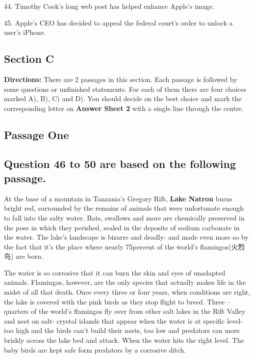 \documentclass[UTF8,11pt]{ctexart}
\begin{document}
44. Timothy Cook’s long web post has helped enhance Apple’s image.


45. Apple’s CEO has decided to appeal the federal court’s order to unlock a user’s iPhone.


\subsection*{\textbf{Section C}}


\textbf{Directions:} There are 2 passages in this section. Each passage is followed by some questions or unfinished statements. For each of them there are four choices marked A), B), C) and D). You should decide on the best choice and mark the corresponding letter on\textbf{ Answer Sheet 2} with a single line through the centre.


\subsection*{\textbf{Passage One}}


\subsection*{\textbf{Question 46 to 50 are based on the following passage.}}


At the base of a mountain in Tanzania’s Gregory Rift,\textbf{ Lake Natron} burns bright red, surrounded by the remains of animals that were unfortunate enough to fall into the salty water. Bats, swallows and more are chemically preserved in the pose in which they perished, sealed in the deposits of sodium carbonate in the water. The lake’s landscape is bizarre and deadly- and made even more so by the fact that it’s the place where nearly 75percent of the world’s flamingos(火烈鸟) are born.


The water is so corrosive that it can burn the skin and eyes of unadapted animals. Flamingos, however, are the only species that actually makes life in the midst of all that death. Once every three or four years, when conditions are right, the lake is covered with the pink birds as they stop flight to breed. Three –quarters of the world’s flamingos fly over from other salt lakes in the Rift Valley and nest on salt- crystal islands that appear when the water is at specific level- too high and the birds can’t build their nests, too low and predators can more briskly across the lake bed and attack. When the water hits the right level. The baby birds are kept safe form predators by a corrosive ditch.
\end{document}
